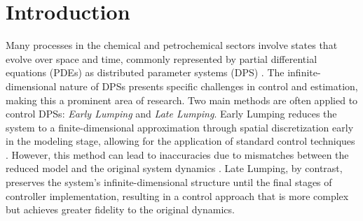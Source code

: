 \section{Introduction}

Many processes in the chemical and petrochemical sectors involve states that evolve over space and time, commonly represented by partial differential equations (PDEs) as distributed parameter systems (DPS) \cite{ray1981advanced}. The infinite-dimensional nature of DPSs presents specific challenges in control and estimation, making this a prominent area of research. Two main methods are often applied to control DPSs: \textit{Early Lumping} and \textit{Late Lumping}. Early Lumping reduces the system to a finite-dimensional approximation through spatial discretization early in the modeling stage, allowing for the application of standard control techniques \cite{davison1976robust}. However, this method can lead to inaccuracies due to mismatches between the reduced model and the original system dynamics \cite{moghadam2012infinite}. Late Lumping, by contrast, preserves the system’s infinite-dimensional structure until the final stages of controller implementation, resulting in a control approach that is more complex but achieves greater fidelity to the original dynamics.

